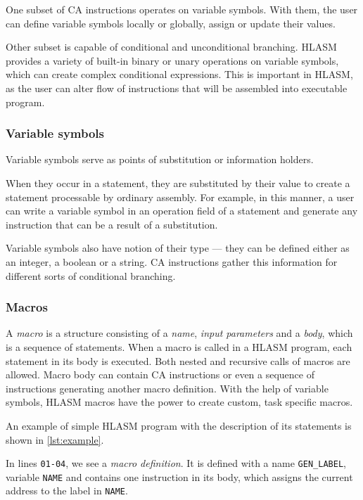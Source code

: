 One subset of CA instructions operates on variable symbols. With them, the user can define variable symbols locally or globally, assign or update their values.

Other subset is capable of conditional and unconditional branching. HLASM provides a variety of built-in binary or unary operations on variable symbols, which can create complex conditional expressions. This is important in HLASM, as the user can alter flow of instructions that will be assembled into executable program.

\subsubsection{Variable symbols}

Variable symbols serve as points of substitution or information holders. 

When they occur in a statement, they are substituted by their value to create a statement processable by ordinary assembly. For example, in this manner, a user can write a variable symbol in an operation field of a statement and generate any instruction that can be a result of a substitution.

Variable symbols also have notion of their type --- they can be defined either as an integer, a boolean or a string. CA instructions gather this information for different sorts of conditional branching.

\subsubsection{Macros}

A \emph{macro} is a structure consisting of a \emph{name}, \emph{input parameters} and a \emph{body}, which is a sequence of statements. When a macro is called in a HLASM program, each statement in its body is executed. Both nested and recursive calls of macros are allowed. Macro body can contain CA instructions or even a sequence of instructions generating another macro definition. With the help of variable symbols, HLASM macros have the power to create custom, task specific macros.

\vspace{5mm}

An example of simple HLASM program with the description of its statements is shown in \cref{lst:example}.


In lines \verb|01-04|, we see a \emph{macro definition}. It is defined with a name \verb|GEN_LABEL|, variable \verb|NAME| and contains one instruction in its body, which assigns the current address to the label in \verb|NAME|.

